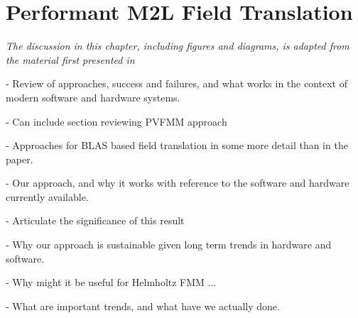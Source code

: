\chapter{Performant M2L Field Translation}\label{chpt:field_translation}
\thispagestyle{chaptertitle} %


\begin{center}
    \textit{The discussion in this chapter, including figures and diagrams, is adapted from the material first presented in \cite{kailasa2024m2ltranslationoperatorskernel} }
\end{center}


- Review of approaches, success and failures, and what works in the context of modern software and hardware systems.

- Can include section reviewing PVFMM approach

- Approaches for BLAS based field translation in some more detail than in the paper.

- Our approach, and why it works with reference to the software and hardware currently available.

- Articulate the significance of this result

- Why our approach is sustainable given long term trends in hardware and software.

- Why might it be useful for Helmholtz FMM ...

- What are important trends, and what have we actually done.